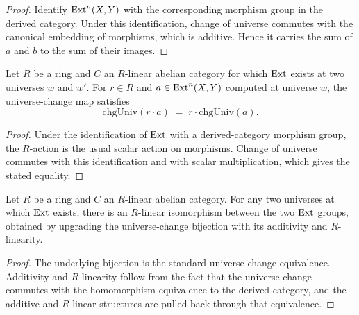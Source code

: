 \begin{proof}
  \leanok

Identify \(\operatorname{Ext}^n(X,Y)\) with the corresponding morphism group in the derived category. Under this identification, change of universe commutes with the canonical embedding of morphisms, which is additive. Hence it carries the sum of \(a\) and \(b\) to the sum of their images.
\end{proof}

\begin{lemma}\label{mk-lem:Abelian_Ext_chgUniv_smul}
  \leanok

  Let \(R\) be a ring and \(C\) an \(R\)-linear abelian category for which \(\operatorname{Ext}\) exists at two universes \(w\) and \(w'\). For \(r \in R\) and \(a \in \operatorname{Ext}^{n}(X, Y)\) computed at universe \(w\), the universe-change map satisfies
  \[
    \mathrm{chgUniv}(r \cdot a) \;=\; r \cdot \mathrm{chgUniv}(a).
  \]
\end{lemma}

\begin{proof}
  \leanok

Under the identification of \(\operatorname{Ext}\) with a derived-category morphism group, the \(R\)-action is the usual scalar action on morphisms. Change of universe commutes with this identification and with scalar multiplication, which gives the stated equality.
\end{proof}

\begin{definition}\label{mk-def:Abelian_Ext_chgUnivLinearEquiv}
  \leanok

  Let \(R\) be a ring and \(C\) an \(R\)-linear abelian category. For any two universes at which \(\operatorname{Ext}\) exists, there is an \(R\)-linear isomorphism between the two \(\operatorname{Ext}\) groups, obtained by upgrading the universe-change bijection with its additivity and \(R\)-linearity.
\end{definition}

\begin{proof}
  \leanok

The underlying bijection is the standard universe-change equivalence. Additivity and \(R\)-linearity follow from the fact that the universe change commutes with the homomorphism equivalence to the derived category, and the additive and \(R\)-linear structures are pulled back through that equivalence.
\end{proof}

